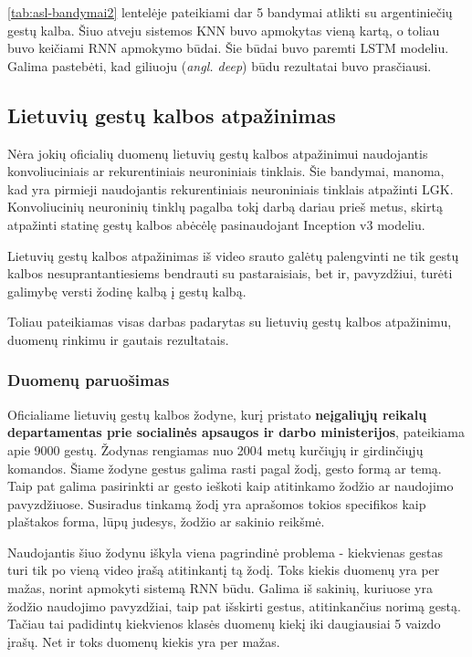 \documentclass{VUMIFPSbakalaurinis}
\begin{document}
\ref{tab:asl-bandymai2} lentelėje pateikiami dar 5 bandymai atlikti su argentiniečių gestų kalba. Šiuo atveju sistemos KNN buvo apmokytas vieną kartą, o toliau buvo keičiami RNN apmokymo būdai. Šie būdai buvo paremti LSTM modeliu. Galima pastebėti, kad giliuoju (\textit{angl. deep}) būdu rezultatai buvo prasčiausi. 

\subsection{Lietuvių gestų kalbos atpažinimas}

Nėra jokių oficialių duomenų lietuvių gestų kalbos atpažinimui naudojantis konvoliuciniais ar rekurentiniais neuroniniais tinklais. Šie bandymai, manoma, kad yra pirmieji naudojantis rekurentiniais neuroniniais tinklais atpažinti LGK. Konvoliucinių neuroninių tinklų pagalba tokį darbą dariau prieš metus, skirtą atpažinti statinę gestų kalbos abėcėlę pasinaudojant Inception v3 modeliu.

Lietuvių gestų kalbos atpažinimas iš video srauto galėtų palengvinti ne tik gestų kalbos nesuprantantiesiems bendrauti su pastaraisiais, bet ir, pavyzdžiui, turėti galimybę versti žodinę kalbą į gestų kalbą. 

Toliau pateikiamas visas darbas padarytas su lietuvių gestų kalbos atpažinimu, duomenų rinkimu ir gautais rezultatais.

\subsubsection{Duomenų paruošimas}
Oficialiame lietuvių gestų kalbos žodyne, kurį pristato \textbf{neįgaliųjų reikalų departamentas prie socialinės apsaugos ir darbo ministerijos}, pateikiama apie 9000 gestų. Žodynas rengiamas nuo 2004 metų kurčiųjų ir girdinčiųjų komandos. Šiame žodyne gestus galima rasti pagal žodį, gesto formą ar temą. Taip pat galima pasirinkti ar gesto ieškoti kaip atitinkamo žodžio ar naudojimo pavyzdžiuose. Susiradus tinkamą žodį yra aprašomos tokios specifikos kaip plaštakos forma, lūpų judesys, žodžio ar sakinio reikšmė. 

Naudojantis šiuo žodynu iškyla viena pagrindinė problema - kiekvienas gestas turi tik po vieną video įrašą atitinkantį tą žodį. Toks kiekis duomenų yra per mažas, norint apmokyti sistemą RNN būdu. Galima iš sakinių, kuriuose yra žodžio naudojimo pavyzdžiai, taip pat išskirti gestus, atitinkančius norimą gestą. Tačiau tai padidintų kiekvienos klasės duomenų kiekį iki daugiausiai 5 vaizdo įrašų. Net ir toks duomenų kiekis yra per mažas.
\end{document}
